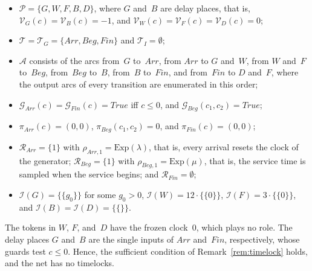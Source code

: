 \documentclass[11pt]{article}
\theoremstyle{definition}
\newcommand{\mset}[1]{\{\!\{#1\}\!\}}
\begin{document}
\begin{itemize}
  \item $\mathcal{P} = \{G, W, F, B, D\}$, where $G$ and~$B$ are delay
    places, that is, $\mathcal{V}_G(c) = \mathcal{V}_B(c) = -1$, and
    $\mathcal{V}_W(c) = \mathcal{V}_F(c) = \mathcal{V}_D(c) = 0$;

  \item $\mathcal{T} = \mathcal{T}_G = \{\mathit{Arr}, \mathit{Beg},
    \mathit{Fin}\}$ and $\mathcal{T}_I = \emptyset$;

  \item $\mathcal{A}$ consists of the arcs from~$G$ to~$\mathit{Arr}$, from
    $\mathit{Arr}$ to $G$ and~$W$, from $W$ and~$F$ to~$\mathit{Beg}$,
    from~$\mathit{Beg}$ to~$B$, from~$B$ to~$\mathit{Fin}$, and
    from~$\mathit{Fin}$ to $D$ and~$F$, where the output arcs of every
    transition are enumerated in this order;

  \item $\mathcal{G}_{\mathit{Arr}}(c) = \mathcal{G}_{\mathit{Fin}}(c) =
    \mathit{True}$ iff $c \le 0$, and $\mathcal{G}_{\mathit{Beg}}(c_1, c_2)
    = \mathit{True}$;

  \item $\pi_{\mathit{Arr}}(c) = (0, 0)$, $\pi_{\mathit{Beg}}(c_1, c_2) =
    0$, and $\pi_{\mathit{Fin}}(c) = (0, 0)$;

  \item $\mathcal{R}_{\mathit{Arr}} = \{1\}$ with
    $\rho_{\mathit{Arr}, 1} = \mathrm{Exp}(\lambda)$, that is, every
    arrival resets the clock of the generator;
    $\mathcal{R}_{\mathit{Beg}} = \{1\}$ with
    $\rho_{\mathit{Beg}, 1} = \mathrm{Exp}(\mu)$, that is, the service time
    is sampled when the service begins; and
    $\mathcal{R}_{\mathit{Fin}} = \emptyset$;

  \item $\mathcal{I}(G) = \mset{g_0}$ for some $g_0 > 0$,
    $\mathcal{I}(W) = 12 \cdot \mset{0}$, $\mathcal{I}(F) = 3 \cdot
    \mset{0}$, and $\mathcal{I}(B) = \mathcal{I}(D) = \mset{}$.
\end{itemize}

The tokens in $W$, $F$, and~$D$ have the frozen clock~$0$, which plays no
role. The delay places $G$ and~$B$ are the single inputs of $\mathit{Arr}$
and~$\mathit{Fin}$, respectively, whose guards test $c \le 0$. Hence, the
sufficient condition of Remark~\ref{rem:timelock} holds, and the net has no
timelocks.
\end{document}
